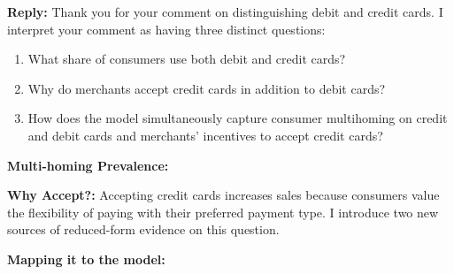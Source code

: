 \documentclass[main.tex]{subfiles}
\begin{document}
\begin{refsection}
\textbf{Reply: } Thank you for your comment on distinguishing debit and credit cards.
I interpret your comment as having three distinct questions:

\begin{enumerate}
    \item What share of consumers use both debit and credit cards?
    \item Why do merchants accept credit cards in addition to debit cards?
    \item How does the model simultaneously capture consumer multihoming on credit and debit cards and merchants' incentives to accept credit cards?
\end{enumerate}

\textbf{Multi-homing Prevalence: } \replycreditdebitmulti

\textbf{Why Accept?: } Accepting credit cards increases sales because consumers value the flexibility of paying with their preferred payment type.
I introduce two new sources of reduced-form evidence on this question.
\replywhyacceptcredit

\textbf{Mapping it to the model: } \replycreditdebitmultimodel

\clearpage
\printbibliography
\end{refsection}

\clearpage

\setcounter{footnote}{0}
\setcounter{page}{1}
\renewcommand{\thepage}{R1-\arabic{page}}

\end{document}
